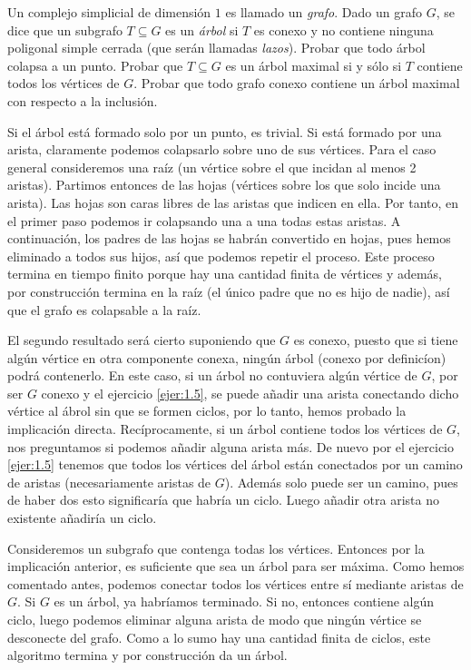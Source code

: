 \documentclass[twoside]{article}
\begin{document}
\begin{ejercicio}{1.7}
Un complejo simplicial de dimensión $1$ es llamado un \emph{grafo}.
Dado un grafo $G$, se dice que un subgrafo $T \subseteq G$ es un \emph{árbol} si $T$ es conexo y no contiene ninguna poligonal simple cerrada (que serán llamadas \emph{lazos}).
Probar que todo árbol colapsa a un punto.
Probar que $T \subseteq G$ es un árbol maximal si y sólo si $T$ contiene todos los vértices de $G$.
Probar que todo grafo conexo contiene un árbol maximal con respecto a la inclusión.
\end{ejercicio}
\begin{solucion}
Si el árbol está formado solo por un punto, es trivial. Si está formado por una arista, claramente podemos colapsarlo sobre uno de sus vértices. Para el caso general consideremos una raíz (un vértice sobre el que incidan al menos 2 aristas). Partimos entonces de las hojas (vértices sobre los que solo incide una arista). Las hojas son caras libres de las aristas que indicen en ella. Por tanto, en el primer paso podemos ir colapsando una a una todas estas aristas. A continuación, los padres de las hojas se habrán convertido en hojas, pues hemos eliminado a todos sus hijos, así que podemos repetir el proceso. Este proceso termina en tiempo finito porque hay una cantidad finita de vértices y además, por construcción termina en la raíz (el único padre que no es hijo de nadie), así que el grafo es colapsable a la raíz.

El segundo resultado será cierto suponiendo que $G$ es conexo, puesto que si tiene algún vértice en otra componente conexa, ningún árbol (conexo por definicíon) podrá contenerlo. En este caso, si un árbol no contuviera algún vértice de $G$, por ser $G$ conexo y el ejercicio \ref{ejer:1.5}, se puede añadir una arista conectando dicho vértice al ábrol sin que se formen ciclos, por lo tanto, hemos probado la implicación directa. Recíprocamente, si un árbol contiene todos los vértices de $G$, nos preguntamos si podemos añadir alguna arista más. De nuevo por el ejercicio \ref{ejer:1.5} tenemos que todos los vértices del árbol están conectados por un camino de aristas (necesariamente aristas de $G$). Además solo puede ser un camino, pues de haber dos esto significaría que habría un ciclo. Luego añadir otra arista no existente añadiría un ciclo.

Consideremos un subgrafo que contenga todas los vértices. Entonces por la implicación anterior, es suficiente que sea un árbol para ser máxima. Como hemos comentado antes, podemos conectar todos los vértices entre sí mediante aristas de $G$. Si $G$ es un árbol, ya habríamos terminado. Si no, entonces contiene algún ciclo, luego podemos eliminar alguna arista de modo que ningún vértice se desconecte del grafo. Como a lo sumo hay una cantidad finita de ciclos, este algoritmo termina y por construcción da un árbol. 


\end{solucion}
\end{document}
